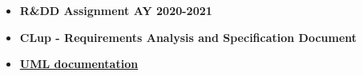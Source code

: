 \documentclass[../../main.tex]{subfiles}
\begin{document}
\begin{itemize}
  \item \textbf{R\&DD Assignment AY 2020-2021}
  \item \textbf{CLup - Requirements Analysis and Specification Document}
  \item \textbf{\href{https://www.uml-diagrams.org/}{UML documentation}}
\end{itemize}
\end{document}
